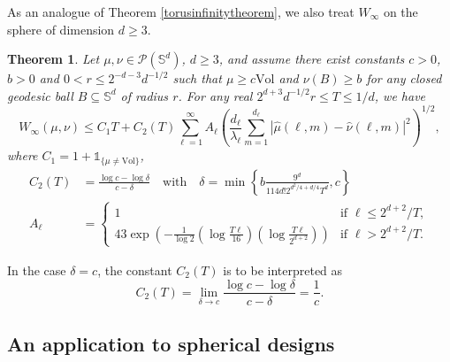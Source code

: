 \documentclass[11pt,a4paper]{article}
\newtheorem{thm}{Theorem}
\theoremstyle{definition}
\begin{document}
As an analogue of Theorem \ref{torusinfinitytheorem}, we also treat $W_{\infty}$ on the sphere of dimension $d \ge 3$.
\begin{thm}\label{sphereinfinitytheorem} Let $\mu, \nu \in \mathcal{P}(\mathbb{S}^d)$, $d \ge 3$, and assume there exist constants $c>0$, $b>0$ and $0<r \le 2^{-d-3}d^{-1/2}$ such that $\mu \ge c \mathrm{Vol}$ and $\nu(B) \ge b$ for any closed geodesic ball $B \subseteq \mathbb{S}^d$ of radius $r$. For any real $2^{d+3}d^{-1/2} r \le T \le 1/d$, we have
\[ W_{\infty} (\mu, \nu) \le C_1 T + C_2(T) \sum_{\ell=1}^{\infty} A_{\ell} \left( \frac{d_{\ell}}{\lambda_{\ell}} \sum_{m=1}^{d_{\ell}} |\widehat{\mu}(\ell,m) - \widehat{\nu}(\ell,m)|^2 \right)^{1/2} , \]
where $C_1 = 1 + \mathds{1}_{\{ \mu \neq \mathrm{Vol} \}}$,
\[ \begin{split} C_2(T) &= \frac{\log c - \log \delta}{c-\delta} \quad \textrm{with} \quad \delta=  \min \left\{ b \frac{9^d}{114 d! 2^{d^2/4+d/4}T^d}, c \right\} \\ A_{\ell} &=\left\{ \begin{array}{ll} 1 & \textrm{if } \ell \le 2^{d+2}/T, \\ \displaystyle{43 \exp \left( - \frac{1}{\log 2} \left( \log \frac{T\ell}{16} \right) \left( \log \frac{T\ell}{2^{d+2}} \right) \right)} & \textrm{if } \ell > 2^{d+2}/T . \end{array} \right. \end{split} \]
\end{thm}
\noindent In the case $\delta =c$, the constant $C_2(T)$ is to be interpreted as
\[ C_2(T)= \lim_{\delta \to c} \frac{\log c - \log \delta}{c-\delta} = \frac{1}{c}. \]

\subsection{An application to spherical designs}\label{sphericaldesignsection}
\end{document}
